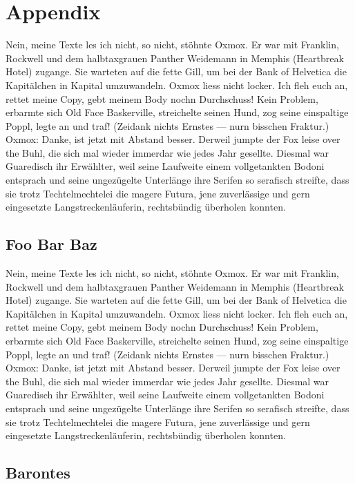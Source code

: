 \chapter{Appendix}

Nein, meine Texte les ich nicht, so nicht, stöhnte Oxmox. Er war mit Franklin, Rockwell und dem halbtaxgrauen Panther Weidemann in Memphis (Heartbreak Hotel) zugange. Sie warteten auf die fette Gill, um bei der Bank of Helvetica die Kapitälchen in Kapital umzuwandeln. Oxmox liess nicht locker. Ich fleh euch an, rettet meine Copy, gebt meinem Body nochn Durchschuss! Kein Problem, erbarmte sich Old Face Baskerville, streichelte seinen Hund, zog seine einspaltige Poppl, legte an und traf! (Zeidank nichts Ernstes --- nurn bisschen Fraktur.) Oxmox: Danke, ist jetzt mit Abstand besser. Derweil jumpte der Fox leise over the Buhl, die sich mal wieder immerdar wie jedes Jahr gesellte. Diesmal war Guaredisch ihr Erwählter, weil seine Laufweite einem vollgetankten Bodoni entsprach und seine ungezügelte Unterlänge ihre Serifen so serafisch streifte, dass sie trotz Techtelmechtelei die magere Futura, jene zuverlässige und gern eingesetzte Langstreckenläuferin, rechtsbündig überholen konnten.

\section{Foo Bar Baz}

Nein, meine Texte les ich nicht, so nicht, stöhnte Oxmox. Er war mit Franklin, Rockwell und dem halbtaxgrauen Panther Weidemann in Memphis (Heartbreak Hotel) zugange. Sie warteten auf die fette Gill, um bei der Bank of Helvetica die Kapitälchen in Kapital umzuwandeln. Oxmox liess nicht locker. Ich fleh euch an, rettet meine Copy, gebt meinem Body nochn Durchschuss! Kein Problem, erbarmte sich Old Face Baskerville, streichelte seinen Hund, zog seine einspaltige Poppl, legte an und traf! (Zeidank nichts Ernstes --- nurn bisschen Fraktur.) Oxmox: Danke, ist jetzt mit Abstand besser. Derweil jumpte der Fox leise over the Buhl, die sich mal wieder immerdar wie jedes Jahr gesellte. Diesmal war Guaredisch ihr Erwählter, weil seine Laufweite einem vollgetankten Bodoni entsprach und seine ungezügelte Unterlänge ihre Serifen so serafisch streifte, dass sie trotz Techtelmechtelei die magere Futura, jene zuverlässige und gern eingesetzte Langstreckenläuferin, rechtsbündig überholen konnten.

\section{Barontes}

